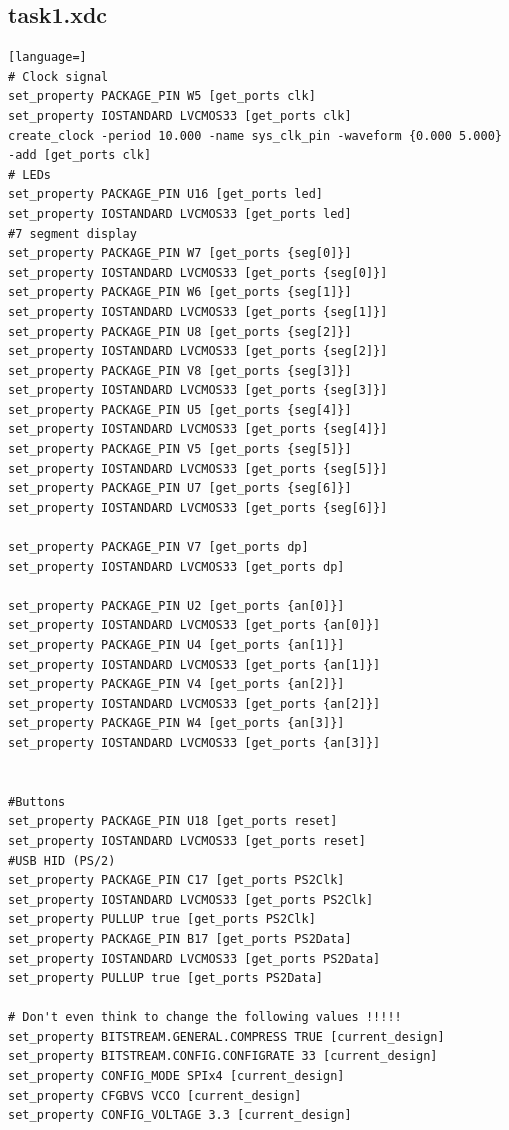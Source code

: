 \documentclass[11pt,a4paper]{article}
\begin{document}
\newpage
\subsection*{task1.xdc}
\begin{lstlisting}[language=]
# Clock signal
set_property PACKAGE_PIN W5 [get_ports clk]
set_property IOSTANDARD LVCMOS33 [get_ports clk]
create_clock -period 10.000 -name sys_clk_pin -waveform {0.000 5.000} -add [get_ports clk]
# LEDs
set_property PACKAGE_PIN U16 [get_ports led]
set_property IOSTANDARD LVCMOS33 [get_ports led]
#7 segment display
set_property PACKAGE_PIN W7 [get_ports {seg[0]}]
set_property IOSTANDARD LVCMOS33 [get_ports {seg[0]}]
set_property PACKAGE_PIN W6 [get_ports {seg[1]}]
set_property IOSTANDARD LVCMOS33 [get_ports {seg[1]}]
set_property PACKAGE_PIN U8 [get_ports {seg[2]}]
set_property IOSTANDARD LVCMOS33 [get_ports {seg[2]}]
set_property PACKAGE_PIN V8 [get_ports {seg[3]}]
set_property IOSTANDARD LVCMOS33 [get_ports {seg[3]}]
set_property PACKAGE_PIN U5 [get_ports {seg[4]}]
set_property IOSTANDARD LVCMOS33 [get_ports {seg[4]}]
set_property PACKAGE_PIN V5 [get_ports {seg[5]}]
set_property IOSTANDARD LVCMOS33 [get_ports {seg[5]}]
set_property PACKAGE_PIN U7 [get_ports {seg[6]}]
set_property IOSTANDARD LVCMOS33 [get_ports {seg[6]}]

set_property PACKAGE_PIN V7 [get_ports dp]
set_property IOSTANDARD LVCMOS33 [get_ports dp]

set_property PACKAGE_PIN U2 [get_ports {an[0]}]
set_property IOSTANDARD LVCMOS33 [get_ports {an[0]}]
set_property PACKAGE_PIN U4 [get_ports {an[1]}]
set_property IOSTANDARD LVCMOS33 [get_ports {an[1]}]
set_property PACKAGE_PIN V4 [get_ports {an[2]}]
set_property IOSTANDARD LVCMOS33 [get_ports {an[2]}]
set_property PACKAGE_PIN W4 [get_ports {an[3]}]
set_property IOSTANDARD LVCMOS33 [get_ports {an[3]}]


#Buttons
set_property PACKAGE_PIN U18 [get_ports reset]
set_property IOSTANDARD LVCMOS33 [get_ports reset]
#USB HID (PS/2)
set_property PACKAGE_PIN C17 [get_ports PS2Clk]
set_property IOSTANDARD LVCMOS33 [get_ports PS2Clk]
set_property PULLUP true [get_ports PS2Clk]
set_property PACKAGE_PIN B17 [get_ports PS2Data]
set_property IOSTANDARD LVCMOS33 [get_ports PS2Data]
set_property PULLUP true [get_ports PS2Data]

# Don't even think to change the following values !!!!!
set_property BITSTREAM.GENERAL.COMPRESS TRUE [current_design]
set_property BITSTREAM.CONFIG.CONFIGRATE 33 [current_design]
set_property CONFIG_MODE SPIx4 [current_design]
set_property CFGBVS VCCO [current_design]
set_property CONFIG_VOLTAGE 3.3 [current_design]
\end{lstlisting}
\end{document}
